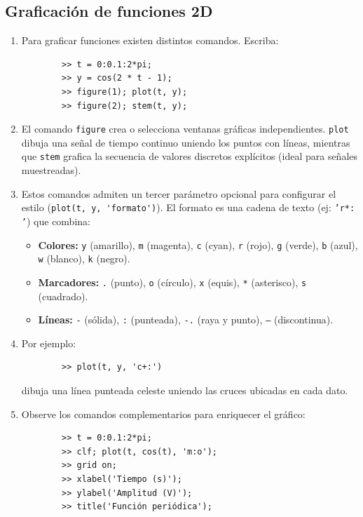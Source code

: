 \documentclass[11pt,a4paper,openany]{book}
\begin{document}
\subsection{Graficación de funciones 2D}

\begin{enumerate}
	\item Para graficar funciones existen distintos comandos. Escriba:
	\begin{verbatim}
		>> t = 0:0.1:2*pi;
		>> y = cos(2 * t - 1);
		>> figure(1); plot(t, y);
		>> figure(2); stem(t, y);
	\end{verbatim}
	
	\item El comando \texttt{figure} crea o selecciona ventanas gráficas independientes. \texttt{plot} dibuja una señal de tiempo continuo uniendo los puntos con líneas, mientras que \texttt{stem} grafica la secuencia de valores discretos explícitos (ideal para señales muestreadas).
	
	\item Estos comandos admiten un tercer parámetro opcional para configurar el estilo (\verb-plot(t, y, 'formato')-). El formato es una cadena de texto (ej: \texttt{'r*: '}) que combina:
	\begin{itemize}
		\item \textbf{Colores:} \texttt{y} (amarillo), \texttt{m} (magenta), \texttt{c} (cyan), \texttt{r} (rojo), \texttt{g} (verde), \texttt{b} (azul), \texttt{w} (blanco), \texttt{k} (negro).
		\item \textbf{Marcadores:} \texttt{.} (punto), \texttt{o} (círculo), \texttt{x} (equis), \texttt{*} (asterisco), \texttt{s} (cuadrado).
		\item \textbf{Líneas:} \texttt{-} (sólida), \texttt{:} (punteada), \texttt{-.} (raya y punto), \texttt{--} (discontinua).
	\end{itemize}
	
	\item Por ejemplo:
	\begin{verbatim}
		>> plot(t, y, 'c+:')
	\end{verbatim}
	dibuja una línea punteada celeste uniendo las cruces ubicadas en cada dato.
	
	\item Observe los comandos complementarios para enriquecer el gráfico:
	\begin{verbatim}
		>> t = 0:0.1:2*pi;
		>> clf; plot(t, cos(t), 'm:o');
		>> grid on;
		>> xlabel('Tiempo (s)');
		>> ylabel('Amplitud (V)');
		>> title('Función periódica');
	\end{verbatim}
	

\end{enumerate}
\end{document}
